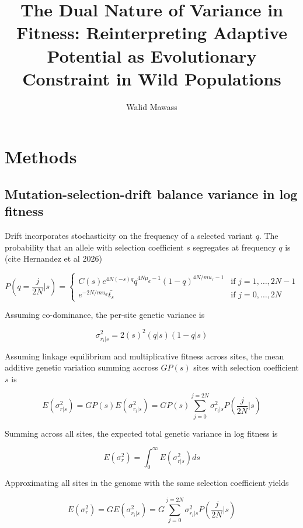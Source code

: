 \documentclass[12pt]{article}
\title{The Dual Nature of Variance in Fitness: Reinterpreting Adaptive Potential as Evolutionary Constraint in Wild Populations}
\author{Walid Mawass}
\date{}
\begin{document}
\section{Methods}

\subsection{Mutation-selection-drift balance variance in log fitness}

Drift incorporates stochasticity on the frequency of a selected variant $q$. The probability that an allele with selection coefficient $s$ segregates at frequency $q$ is (cite Hernandez et al 2026)

\begin{equation}
    P(q=\frac{j}{2N} | s) = 
    \begin{cases}
        C(s)e^{4N(-s)q}q^{4N\mu_d-1}(1-q)^{4N/mu_r-1} & \text{if } j = 1, \ldots, 2N-1 \\
        e^{-2N/mu_d} \bar{t_s} & \text{if } j = 0, \ldots, 2N
    \end{cases}
\end{equation}

Assuming co-dominance, the per-site genetic variance is

\begin{equation}
    \sigma_{r_i|s}^{2} = 2(s)^2(q|s)(1-q|s)
\end{equation}

Assuming linkage equilibrium and multiplicative fitness across sites, the mean additive genetic variation summing accross $GP(s)$ sites with selection coefficient $s$ is

\begin{equation}
    E(\sigma_{r|s}^{2}) = G P(s) E(\sigma_{r_i|s}^{2}) = G P(s) \sum_{j=0}^{j=2N} \sigma_{r_i|s}^{2} P(\frac{j}{2N} | s)   
\end{equation}

Summing across all sites, the expected total genetic variance in log fitness is

\begin{equation}
    E(\sigma_{r}^{2}) = \int_{0}^{\infty} E(\sigma_{r|s}^{2}) ds  
\end{equation}


Approximating all sites in the genome with the same selection coefficient yields

\begin{equation}
    E(\sigma_{r}^{2}) = G E(\sigma_{r_i|s}^{2}) = G \sum_{j=0}^{j=2N} \sigma_{r_i|s}^{2} P(\frac{j}{2N} | s)   
\end{equation}
\end{document}
